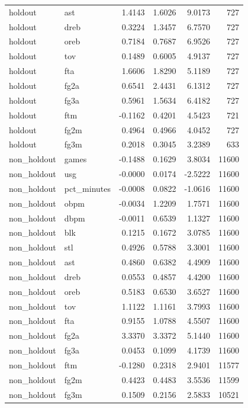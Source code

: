 \begin{table}
\begin{tabular}{llrrrr}
holdout & ast & 1.4143 & 1.6026 & 9.0173 & 727 \\
holdout & dreb & 0.3224 & 1.3457 & 6.7570 & 727 \\
holdout & oreb & 0.7184 & 0.7687 & 6.9526 & 727 \\
holdout & tov & 0.1489 & 0.6005 & 4.9137 & 727 \\
holdout & fta & 1.6606 & 1.8290 & 5.1189 & 727 \\
holdout & fg2a & 0.6541 & 2.4431 & 6.1312 & 727 \\
holdout & fg3a & 0.5961 & 1.5634 & 6.4182 & 727 \\
holdout & ftm & -0.1162 & 0.4201 & 4.5423 & 721 \\
holdout & fg2m & 0.4964 & 0.4966 & 4.0452 & 727 \\
holdout & fg3m & 0.2018 & 0.3045 & 3.2389 & 633 \\
non\_holdout & games & -0.1488 & 0.1629 & 3.8034 & 11600 \\
non\_holdout & usg & -0.0000 & 0.0174 & -2.5222 & 11600 \\
non\_holdout & pct\_minutes & -0.0008 & 0.0822 & -1.0616 & 11600 \\
non\_holdout & obpm & -0.0034 & 1.2209 & 1.7571 & 11600 \\
non\_holdout & dbpm & -0.0011 & 0.6539 & 1.1327 & 11600 \\
non\_holdout & blk & 0.1215 & 0.1672 & 3.0785 & 11600 \\
non\_holdout & stl & 0.4926 & 0.5788 & 3.3001 & 11600 \\
non\_holdout & ast & 0.4860 & 0.6382 & 4.4909 & 11600 \\
non\_holdout & dreb & 0.0553 & 0.4857 & 4.4200 & 11600 \\
non\_holdout & oreb & 0.5183 & 0.6530 & 3.6527 & 11600 \\
non\_holdout & tov & 1.1122 & 1.1161 & 3.7993 & 11600 \\
non\_holdout & fta & 0.9155 & 1.0788 & 4.5507 & 11600 \\
non\_holdout & fg2a & 3.3370 & 3.3372 & 5.1440 & 11600 \\
non\_holdout & fg3a & 0.0453 & 0.1099 & 4.1739 & 11600 \\
non\_holdout & ftm & -0.1280 & 0.2318 & 2.9401 & 11577 \\
non\_holdout & fg2m & 0.4423 & 0.4483 & 3.5536 & 11599 \\
non\_holdout & fg3m & 0.1509 & 0.2156 & 2.5833 & 10521 \\
\bottomrule
\end{tabular}
\end{table}
